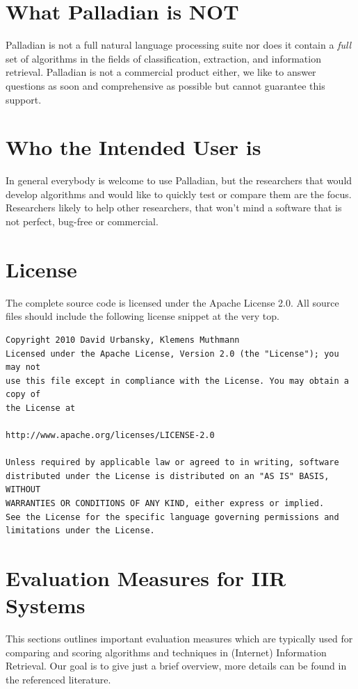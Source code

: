 \documentclass[a4paper,twoside]{book}      %
\begin{document}
\section{What Palladian is NOT}
Palladian is not a full natural language processing suite nor does it contain a \textit{ full} set of algorithms in the fields of classification, extraction, and information retrieval. Palladian is not a commercial product either, we like to answer questions as soon and comprehensive as possible but cannot guarantee this support.

\section{Who the Intended User is}
In general everybody is welcome to use Palladian, but the researchers that would develop algorithms and would like to quickly test or compare them are the focus. Researchers likely to help other researchers, that won't mind a software that is not perfect, bug-free or commercial.

\section{License}
The complete source code is licensed under the Apache License 2.0. All source files should include the following license snippet at the very top.

\begin{verbatim}
Copyright 2010 David Urbansky, Klemens Muthmann
Licensed under the Apache License, Version 2.0 (the "License"); you may not
use this file except in compliance with the License. You may obtain a copy of
the License at

http://www.apache.org/licenses/LICENSE-2.0

Unless required by applicable law or agreed to in writing, software
distributed under the License is distributed on an "AS IS" BASIS, WITHOUT
WARRANTIES OR CONDITIONS OF ANY KIND, either express or implied.
See the License for the specific language governing permissions and
limitations under the License.
\end{verbatim}

\section{Evaluation Measures for IIR Systems}

This sections outlines important evaluation measures which are typically used for comparing and scoring algorithms and techniques in (Internet) Information Retrieval. Our goal is to give just a brief overview, more details can be found in the referenced literature.
\end{document}
